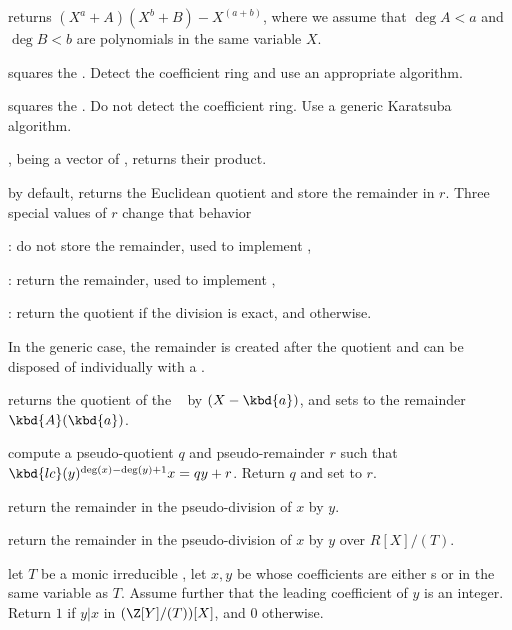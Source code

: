 returns $(X^a + A)(X^b + B) - X^(a+b)$, where we assume that $\deg A < a$
and $\deg B < b$ are polynomials in the same variable $X$.

 squares the  . Detect the coefficient
ring and use an appropriate algorithm.

 squares the  . Do not detect the
coefficient ring.  Use a generic Karatsuba algorithm.

,  being a vector of ,
returns their product.

 by default, returns the Euclidean
quotient and store the remainder in $r$. Three special values of $r$ change
that behavior
\item {}: do not store the remainder, used to implement ,

\item {}: return the remainder, used to implement ,

\item {}: return the quotient if the division is exact, and
 otherwise.

In the generic case, the remainder is created after the quotient and can be
disposed of individually with a .


 returns the
quotient of the ~ by $(X - \kbd{a})$, and sets  to the
remainder $\kbd{A}(\kbd{a})$.


 compute a pseudo-quotient
$q$ and pseudo-remainder $r$ such that $\kbd{lc}(y)^{\deg(x) - \deg(y) + 1}x
= qy + r$. Return $q$ and set  to $r$.

 return the remainder
in the pseudo-division of $x$ by $y$.

 return the remainder
in the pseudo-division of $x$ by $y$ over $R[X]/(T)$.

 let $T$ be a monic irreducible
, let $x, y$ be  whose coefficients are either s or
 in the same variable as $T$. Assume further that the leading
coefficient of $y$ is an integer. Return $1$ if $y | x$ in $(\Z[Y]/(T))[X]$,
and $0$ otherwise.

